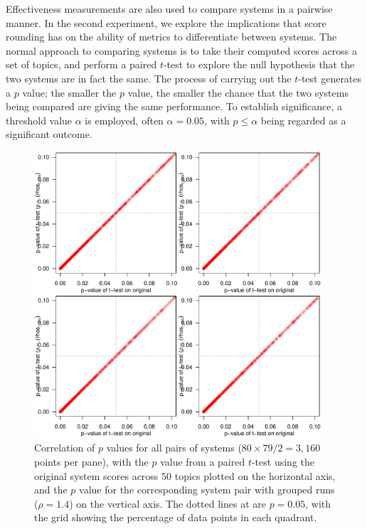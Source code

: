 
Effectiveness measurements are also used to compare systems in a
pairwise manner.
In the second experiment, we explore the implications that score
rounding has on the ability of metrics to differentiate between
systems.
The normal approach to comparing systems is to take their computed
scores across a set of topics, and perform a paired $t$-test to
explore the null hypothesis that the two systems are in fact the
same.
The process of carrying out the $t$-test generates a $p$ value; the
smaller the $p$ value, the smaller the chance that the two systems
being compared are giving the same performance.
To establish significance, a threshold value $\alpha$ is employed,
often $\alpha=0.05$, with $p\le\alpha$ being regarded as a
significant outcome.

\begin{figure}[t!]
\centering
\includegraphics[width=0.95\textwidth,page=5]{figs/p_value_scatter_sys_pairs.pdf}
\caption{Correlation of $p$ values for all pairs of systems
($80\times79/2=3{,}160$ points per pane), with the $p$ value from a
paired $t$-test using the original system scores across $50$ topics
plotted on the horizontal axis, and the $p$ value for the
corresponding system pair with grouped runs ($\rho=1.4$) on the
vertical axis.
The dotted lines at are $p=0.05$, with the grid showing the
percentage of data points in each quadrant.
\label{fig-pair-variation}}
\end{figure}

